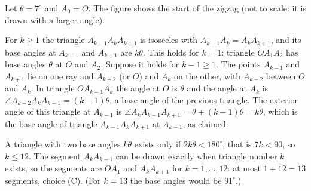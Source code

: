 Let $\theta=7^\circ$ and $A_0=O$. The figure shows the start of the zigzag (not to scale: it is drawn with a larger angle).


For $k\ge1$ the triangle $A_{k-1}A_kA_{k+1}$ is isosceles with $A_{k-1}A_k=A_kA_{k+1}$, and its base angles at $A_{k-1}$ and $A_{k+1}$ are $k\theta$. This holds for $k=1$: triangle $OA_1A_2$ has base angles $\theta$ at $O$ and $A_2$. Suppose it holds for $k-1\ge1$. The points $A_{k-1}$ and $A_{k+1}$ lie on one ray and $A_{k-2}$ (or $O$) and $A_k$ on the other, with $A_{k-2}$ between $O$ and $A_k$. In triangle $OA_{k-1}A_k$ the angle at $O$ is $\theta$ and the angle at $A_k$ is $\angle A_{k-2}A_kA_{k-1}=(k-1)\theta$, a base angle of the previous triangle. The exterior angle of this triangle at $A_{k-1}$ is $\angle A_kA_{k-1}A_{k+1}=\theta+(k-1)\theta=k\theta$, which is the base angle of triangle $A_{k-1}A_kA_{k+1}$ at $A_{k-1}$, as claimed.

A triangle with two base angles $k\theta$ exists only if $2k\theta<180^\circ$, that is $7k<90$, so $k\le12$. The segment $A_kA_{k+1}$ can be drawn exactly when triangle number $k$ exists, so the segments are $OA_1$ and $A_kA_{k+1}$ for $k=1,\dots,12$: at most $1+12=\boxed{13}$ segments, choice (C). (For $k=13$ the base angles would be $91^\circ$.)
